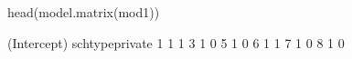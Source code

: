 \begin{Schunk}
\begin{Sinput}
 head(model.matrix(mod1))
\end{Sinput}
\begin{Soutput}
  (Intercept) schtypeprivate
1           1              1
3           1              0
5           1              0
6           1              1
7           1              0
8           1              0
\end{Soutput}
\end{Schunk}
